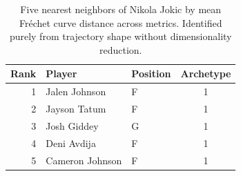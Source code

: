 \begin{table}[htbp]
  \centering\small
  \begin{tabular}{rllc}
    \toprule
    Rank & Player & Position & Archetype \\
    \midrule
    1 & Jalen Johnson & F & 1 \\
    2 & Jayson Tatum & F & 1 \\
    3 & Josh Giddey & G & 1 \\
    4 & Deni Avdija & F & 1 \\
    5 & Cameron Johnson & F & 1 \\
    \bottomrule
  \end{tabular}
  \caption{Five nearest neighbors of Nikola Jokic by mean Fr\'{e}chet curve distance across metrics. Identified purely from trajectory shape without dimensionality reduction.}
  \label{tab:Nikola_Jokic_frechet_curve_neighbors}
\end{table}

